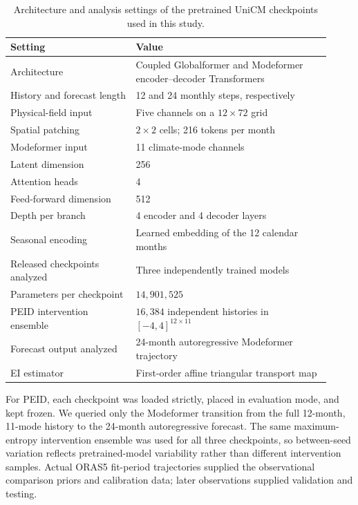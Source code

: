 \documentclass[fleqn,10pt]{wlscirep}
\begin{document}
\begin{table}[!ht]\centering\caption{Architecture and analysis settings of the pretrained UniCM checkpoints used in this study.}\label{tab:unicm_parameters}\small\renewcommand{\arraystretch}{1.08}\begin{tabular}{p{0.36\linewidth}p{0.56\linewidth}}\hline{} Setting & Value \\\hline{} Architecture & Coupled Globalformer and Modeformer encoder--decoder Transformers \\History and forecast length & 12 and 24 monthly steps, respectively \\Physical-field input & Five channels on a $12\times72$ grid \\Spatial patching & $2\times2$ cells; 216 tokens per month \\Modeformer input & 11 climate-mode channels \\Latent dimension & 256 \\Attention heads & 4 \\Feed-forward dimension & 512 \\Depth per branch & 4 encoder and 4 decoder layers \\Seasonal encoding & Learned embedding of the 12 calendar months \\Released checkpoints analyzed & Three independently trained models \\Parameters per checkpoint & $14{,}901{,}525$ \\PEID intervention ensemble & $16{,}384$ independent histories in $[-4,4]^{12\times11}$ \\ Forecast output analyzed & 24-month autoregressive Modeformer trajectory \\EI estimator & First-order affine triangular transport map \\\hline\end{tabular}\end{table}

For PEID, each checkpoint was loaded strictly, placed in evaluation mode, and kept frozen. We queried only the Modeformer transition from the full 12-month, 11-mode history to the 24-month autoregressive forecast. The same maximum-entropy intervention ensemble was used for all three checkpoints, so between-seed variation reflects pretrained-model variability rather than different intervention samples. Actual ORAS5 fit-period trajectories supplied the observational comparison priors and calibration data; later observations supplied validation and testing.
\end{document}
